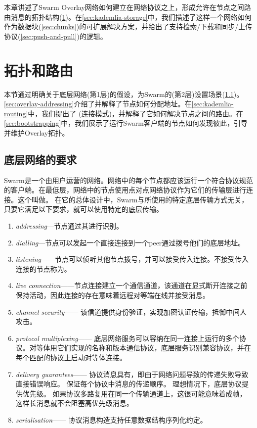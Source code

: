 本章讲述了Swarm Overlay网络如何建立在网络协议之上，形成允许在节点之间路由消息的拓扑结构(\ref{sec:topology-routing})。在\ref{sec:kademlia-storage}中，我们描述了这样一个网络如何作为数据块(\ref{sec:chunks})的可扩展解决方案，并给出了支持检索/下载和同步/上传协议(\ref{sec:push-and-pull})的逻辑。

\section{拓扑和路由\statusgreen}\label{sec:topology-routing}

本节通过明确关于底层网络(第1层)的假设，为Swarm的(第2层)设置场景(\ref{sec:underlay-transport})。\ref{sec:overlay-addressing}介绍了并解释了节点如何分配地址。在\ref{sec:kademlia-routing}中，我们提出了 (连接模式)，并解释了它如何解决节点之间的路由。在\ref{sec:bootstrapping}中，我们展示了运行Swarm客户端的节点如何发现彼此，引导并维护Overlay拓扑。

\subsection{底层网络的要求\statusyellow}\label{sec:underlay-transport} 

\yellow{}

Swarm是一个由用户运营的网络。网络中的每个节点都应该运行一个符合协议规范的客户端。在最低层，网络中的节点使用点对点网络协议作为它们的传输层进行连接。这个叫做。
在它的总体设计中，Swarm与所使用的特定底层传输方式无关，只要它满足以下要求，就可以使用特定的底层传输。

\begin{enumerate}
    \item \emph{addressing}—节点通过其进行识别。
    \item \emph{dialling}—节点可以发起一个直接连接到一个peer通过拨号他们的底层地址。
    \item \emph{listening}——节点可以侦听其他节点拨号，并可以接受传入连接。不接受传入连接的节点称为。
    \item \emph{live connection}——节点连接建立一个通信通道，该通道在显式断开连接之前保持活动，因此连接的存在意味着远程对等端在线并接受消息。
    \item \emph{channel security}——
该信道提供身份验证，实现加密认证传输，抵御中间人攻击。
    \item \emph{protocol multiplexing}——
底层网络服务可以容纳在同一连接上运行的多个协议。对等体用它们实现的名称和版本通信协议，底层服务识别兼容协议，并在每个匹配的协议上启动对等体连接。 
    \item \emph{delivery guarantees}——
协议消息具有，即由于网络问题导致的传递失败导致直接错误响应。
保证每个协议中消息的传递顺序。
理想情况下，底层协议提供优先级。
如果协议多路复用在同一个传输通道上，这很可能意味着成帧，这样长消息就不会阻塞高优先级消息。
    \item \emph{serialisation}——
协议消息构造支持任意数据结构序列化约定。
    
\end{enumerate}


